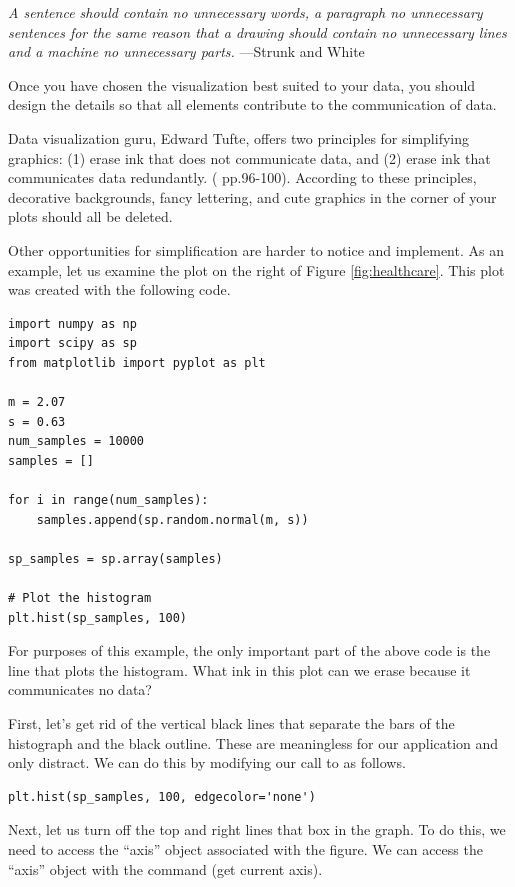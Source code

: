 \noindent\emph{A sentence should contain no unnecessary words, a paragraph no unnecessary sentences for the same reason that a drawing should contain no unnecessary lines and a machine no unnecessary parts.} \small{---Strunk and White}


Once you have chosen the visualization best suited to your data, you should design the details so that all elements contribute to the communication of data. 

Data visualization guru, Edward Tufte, offers two principles for simplifying graphics: (1) erase ink that does not communicate data, and (2) erase ink that communicates data redundantly.  (\cite{tufte2001} pp.96-100). According to these principles, decorative backgrounds, fancy lettering, and cute graphics in the corner of your plots should all be deleted.

Other opportunities for simplification are harder to notice and implement. As an example, let us examine the plot on the right of Figure \ref{fig:healthcare}. 
This plot was created with the following code.

\begin{lstlisting}
import numpy as np
import scipy as sp
from matplotlib import pyplot as plt

m = 2.07
s = 0.63
num_samples = 10000
samples = []

for i in range(num_samples):
    samples.append(sp.random.normal(m, s)) 

sp_samples = sp.array(samples)

# Plot the histogram
plt.hist(sp_samples, 100)
\end{lstlisting}

For purposes of this example, the only important part of the above code is the line  that plots the histogram. 
What ink in this plot can we erase because it communicates no data?

First, let's get rid of the vertical black lines that separate the bars of the histograph and the black outline. These are meaningless for our application and only distract. 
We can do this by modifying our call to  as follows.

\begin{lstlisting}
plt.hist(sp_samples, 100, edgecolor='none')
\end{lstlisting}

Next, let us turn off the top and right lines that box in the graph. 
To do this, we need to access the ``axis'' object associated with the figure. 
We can access the ``axis'' object with the command  (get current axis).

